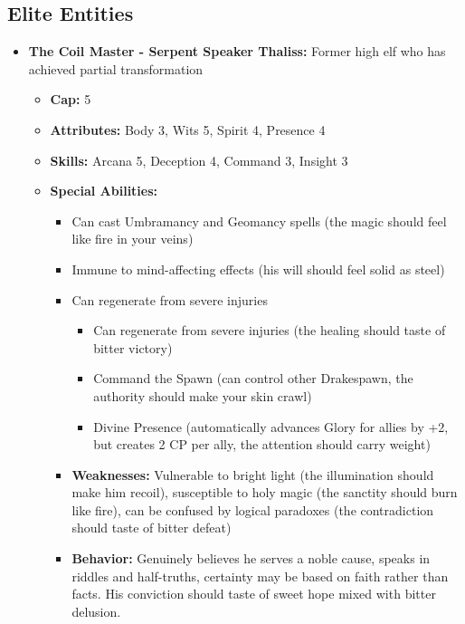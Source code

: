 \documentclass[11pt]{article}
\begin{document}
\begin{itemize}
\subsection{Elite Entities}
\begin{itemize}
\item \textbf{The Coil Master - Serpent Speaker Thaliss:} Former high elf who has achieved partial transformation
  \begin{itemize}
  \item \textbf{Cap:} 5
  \item \textbf{Attributes:} Body 3, Wits 5, Spirit 4, Presence 4
  \item \textbf{Skills:} Arcana 5, Deception 4, Command 3, Insight 3
  \item \textbf{Special Abilities:}
    \begin{itemize}
    \item Can cast Umbramancy and Geomancy spells (the magic should feel like fire in your veins)
    \item Immune to mind-affecting effects (his will should feel solid as steel)
    \item Can regenerate from severe injuries\begin{itemize}
    \item Can regenerate from severe injuries (the healing should taste of bitter victory)
    \item Command the Spawn (can control other Drakespawn, the authority should make your skin crawl)
    \item Divine Presence (automatically advances Glory for allies by +2, but creates 2 CP per ally, the attention should carry weight)
    \end{itemize}
  \item \textbf{Weaknesses:} Vulnerable to bright light (the illumination should make him recoil), susceptible to holy magic (the sanctity should burn like fire), can be confused by logical paradoxes (the contradiction should taste of bitter defeat)
  \item \textbf{Behavior:} Genuinely believes he serves a noble cause, speaks in riddles and half-truths, certainty may be based on faith rather than facts. His conviction should taste of sweet hope mixed with bitter delusion.

\end{itemize}
\end{itemize}
\end{itemize}
\end{itemize}
\end{document}

